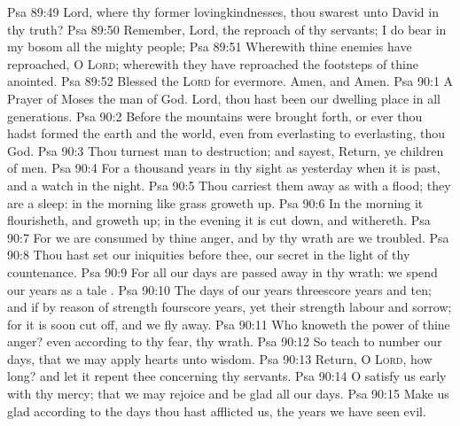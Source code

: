 \vs Psa 89:49 Lord, where  thy former lovingkindnesses,  thou swarest unto David in thy truth?
\vs Psa 89:50 Remember, Lord, the reproach of thy servants;  I do bear in my bosom  all the mighty people;
\vs Psa 89:51 Wherewith thine enemies have reproached, O \textsc{Lord}; wherewith they have reproached the footsteps of thine anointed.
\vs Psa 89:52 Blessed  the \textsc{Lord} for evermore. Amen, and Amen.
\vs Psa 90:1 A Prayer of Moses the man of God. Lord, thou hast been our dwelling place in all generations.
\vs Psa 90:2 Before the mountains were brought forth, or ever thou hadst formed the earth and the world, even from everlasting to everlasting, thou  God.
\vs Psa 90:3 Thou turnest man to destruction; and sayest, Return, ye children of men.
\vs Psa 90:4 For a thousand years in thy sight  as yesterday when it is past, and  a watch in the night.
\vs Psa 90:5 Thou carriest them away as with a flood; they are  a sleep: in the morning  like grass  groweth up.
\vs Psa 90:6 In the morning it flourisheth, and groweth up; in the evening it is cut down, and withereth.
\vs Psa 90:7 For we are consumed by thine anger, and by thy wrath are we troubled.
\vs Psa 90:8 Thou hast set our iniquities before thee, our secret  in the light of thy countenance.
\vs Psa 90:9 For all our days are passed away in thy wrath: we spend our years as a tale .
\vs Psa 90:10 The days of our years  threescore years and ten; and if by reason of strength  fourscore years, yet  their strength labour and sorrow; for it is soon cut off, and we fly away.
\vs Psa 90:11 Who knoweth the power of thine anger? even according to thy fear,  thy wrath.
\vs Psa 90:12 So teach  to number our days, that we may apply  hearts unto wisdom.
\vs Psa 90:13 Return, O \textsc{Lord}, how long? and let it repent thee concerning thy servants.
\vs Psa 90:14 O satisfy us early with thy mercy; that we may rejoice and be glad all our days.
\vs Psa 90:15 Make us glad according to the days  thou hast afflicted us,  the years  we have seen evil.
